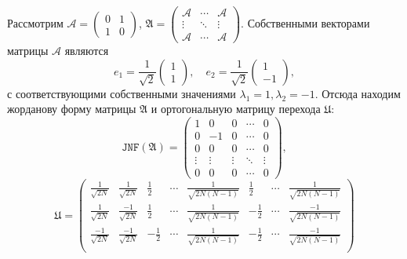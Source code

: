  \begin{example}
     Рассмотрим \( \mathcal{A} = \begin{pmatrix} 0 & 1 \\ 1 & 0 \end{pmatrix} \),
         \( \mathfrak{A} =
                    \begin{pmatrix}
                        \mathcal{A} & \cdots & \mathcal{A} \\
                        \vdots      & \ddots & \vdots \\
                        \mathcal{A} & \cdots & \mathcal{A}
                    \end{pmatrix} \).
     Собственными векторами матрицы \( \mathcal{A} \) являются
     \[
         e_1 = \frac{1}{\sqrt2}\begin{pmatrix} 1 \\ 1 \end{pmatrix},\quad e_2 = \frac{1}{\sqrt2}\begin{pmatrix} 1 \\ -1 \end{pmatrix},
             \]
         с соответствующими собственными значениями \( \lambda_1=1, \lambda_2=-1 \).
     Отсюда находим жорданову форму матрицы \( \mathfrak{A} \) и ортогональную матрицу перехода \( \mathfrak{U} \):
     \[
         \mathtt{JNF}(\mathfrak{A}) =
         \begin{pmatrix}
             1 & 0  & 0 & \cdots & 0 \\
             0 & -1 & 0 & \cdots & 0 \\
             0 & 0  & 0 & \cdots & 0 \\
             \vdots & \vdots & \vdots & \ddots & \vdots \\
             0 & 0 & 0 & \cdots & 0
         \end{pmatrix}, \]
     \[
         \mathfrak{U} = 
         \begin{pmatrix}
             \frac{1}{\sqrt{2N}}  & \frac{1}{\sqrt{2N}}  & \frac12  & \cdots & \frac{1}{\sqrt{2N(N-1)}}   & \frac12  & \cdots & \frac{1}{\sqrt{2N(N-1)}} \\
             \frac{1}{\sqrt{2N}}  & \frac{-1}{\sqrt{2N}} & \frac12  & \cdots & \frac{1}{\sqrt{2N(N-1)}}   & -\frac12 & \cdots & \frac{-1}{\sqrt{2N(N-1)}} \\
             \frac{-1}{\sqrt{2N}} & \frac{-1}{\sqrt{2N}} & -\frac12 & \cdots & \frac{1}{\sqrt{2N(N-1)}}   & -\frac12 & \cdots & \frac{-1}{\sqrt{2N(N-1)}} \\

\end{pmatrix}\]
\end{example}
